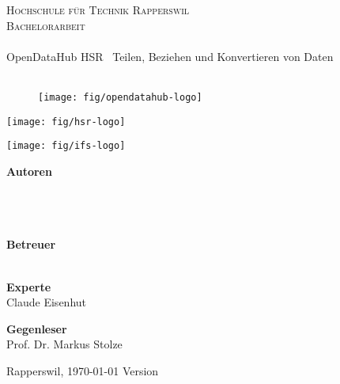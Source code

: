 
\author{
	\rlif \\
	\and
	\chuf \\
	\and
	\fscf \\
}

\clearpage
\begin{titlepage}
	
	\begin{center}
		\textsc{Hochschule für Technik Rapperswil} \\
		\textsc{Bachelorarbeit} \\ [25pt]
		\hr{0.5pt} \\[0.2cm]
		\huge OpenDataHub HSR \textendash\ Teilen, Beziehen und Konvertieren von Daten \\
		\hr{2pt} \\[0.3cm]
		
		\begin{figure}[H]
			\centering
			\texttt{[image: fig/opendatahub-logo]}
		\end{figure}
		
		\begin{minipage}{0.4\textwidth}
			\texttt{[image: fig/hsr-logo]}
		\end{minipage}
		\begin{minipage}{0.4\textwidth}
			\texttt{[image: fig/ifs-logo]}
		\end{minipage}
		
		\vfill
	\end{center}
	
		
	\begin{flushleft}
		\textbf{\Large Autoren}\\
		\Large \rlif \\
		\Large \chuf \\
		\Large \fscf \\
		\vspace{0.5cm}
		
		\textbf{\Large Betreuer}\\
		\Large \proff\\
		\vspace{0.3cm}
		
		\textbf{\Large Experte}\\
		\Large Claude Eisenhut
		\vspace{0.3cm}

		\textbf{\Large Gegenleser}\\
		\Large Prof. Dr. Markus Stolze
		\vspace{0.3cm}
		
		\vspace{1.5cm}
		 Rapperswil, \today
		\hfill
		Version \version
	\end{flushleft}

\end{titlepage}

\restoregeometry

